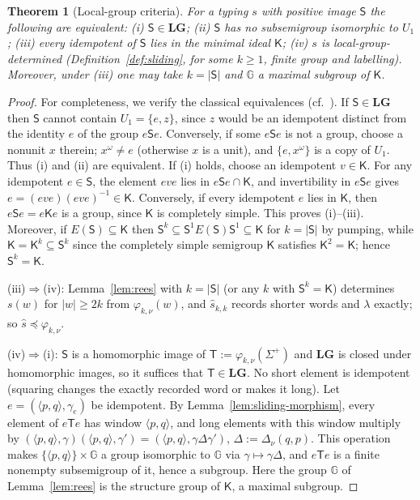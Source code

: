 \documentclass[11pt]{article}
\numberwithin{equation}{section}
\theoremstyle{plain}
\newtheorem{theorem}{Theorem}[section]
\theoremstyle{definition}
\theoremstyle{remark}
\theoremstyle{plain}
\newcommand{\LG}{\mathbf{LG}}
\begin{document}
\begin{theorem}[Local-group criteria]
\label{thm:lg-characterization}
For a typing $s$ with positive image $\mathsf S$ the following are equivalent:
\textup{(i)} $\mathsf S\in\LG$; \textup{(ii)} $\mathsf S$ has no subsemigroup isomorphic
to $U_1$; \textup{(iii)} every idempotent of $\mathsf S$ lies in the minimal ideal
$\mathsf K$; \textup{(iv)} $s$ is local-group-determined \textup(Definition~\ref{def:sliding}, for
some $k\ge1$, finite group and labelling\textup).  Moreover, under
\textup{(iii)} one may take $k=|\mathsf S|$ and $\mathbb G$ a maximal subgroup of $\mathsf K$.
\end{theorem}

\begin{proof}
For completeness, we verify the classical equivalences (cf.\
\cite[Proposition~2.3]{AlmeidaEtAl2009}).  If $\mathsf S\in\LG$
then $\mathsf S$ cannot contain $U_1=\{e,z\}$, since $z$ would be an idempotent
distinct from the identity $e$ of the group $e\mathsf Se$.
Conversely, if some $e\mathsf Se$ is not a group, choose a nonunit $x$ therein;
$x^\omega\ne e$ (otherwise $x$ is a unit), and
$\{e,x^\omega\}$ is a copy of $U_1$.  Thus (i) and (ii) are equivalent.
If (i) holds, choose an idempotent $v\in\mathsf K$.
For any idempotent $e\in\mathsf S$, the element $eve$ lies in
$e\mathsf Se\cap\mathsf K$, and invertibility in $e\mathsf Se$ gives
$e=(eve)(eve)^{-1}\in\mathsf K$.  Conversely, if every idempotent
$e$ lies in $\mathsf K$, then $e\mathsf Se=e\mathsf Ke$ is a group,
since $\mathsf K$ is completely simple.  This proves (i)--(iii).
Moreover, if $E(\mathsf S)\subseteq\mathsf K$ then
$\mathsf S^k\subseteq\mathsf S^1E(\mathsf S)\mathsf S^1\subseteq\mathsf K$
for $k=|\mathsf S|$ by pumping, while $\mathsf K=\mathsf K^k\subseteq\mathsf S^k$
since the completely simple semigroup $\mathsf K$ satisfies $\mathsf K^2=\mathsf K$; hence $\mathsf S^k=\mathsf K$.

(iii)$\Rightarrow$(iv): Lemma~\ref{lem:rees} with
$k=|\mathsf S|$ (or any $k$ with $\mathsf S^k=\mathsf K$) determines $s(w)$ for $|w|\ge2k$ from
$\varphi_{k,\nu}(w)$, and $\widehat s_{k,k}$ records shorter words and $\lambda$ exactly;
so $\widehat s\preceq\varphi_{k,\nu}$.

(iv)$\Rightarrow$(i): $\mathsf S$ is a homomorphic image of $\mathsf T:=\varphi_{k,\nu}(\Sigma^+)$ and
$\LG$ is closed under homomorphic images, so it suffices that $\mathsf T\in\LG$.
No short element is idempotent (squaring changes the exactly recorded word or makes
it long).  Let $e=(\langle p,q\rangle,\gamma_e)$ be idempotent.  By
Lemma~\ref{lem:sliding-morphism}, every element of $e\mathsf Te$ has window
$\langle p,q\rangle$, and long elements with this window multiply by
$(\langle p,q\rangle,\gamma)(\langle p,q\rangle,\gamma')=(\langle p,q\rangle,\gamma\Delta\gamma')$,
$\Delta:=\Delta_\nu(q,p)$.  This operation makes $\{\langle p,q\rangle\}\times \mathbb G$ a group
isomorphic to $\mathbb G$ via $\gamma\mapsto\gamma\Delta$, and $e\mathsf Te$ is a finite nonempty
subsemigroup of it, hence a subgroup.
Here the group $\mathbb G$ of Lemma~\ref{lem:rees} is the structure group of $\mathsf K$, a maximal subgroup.
\end{proof}
\end{document}
